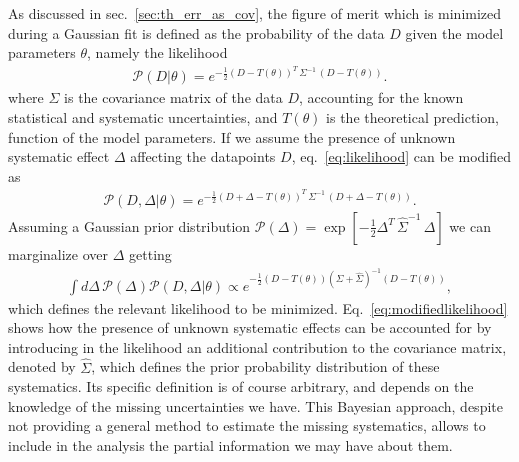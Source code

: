 %
As discussed in sec.~\ref{sec:th_err_as_cov}, the figure of merit which is minimized during a Gaussian fit is defined 
as the probability of the data $D$ given the model parameters $\theta$, namely the likelihood
\begin{align}
    \label{eq:likelihood}
    \mathcal{P}\left(D|\theta\right) = e^{-\frac{1}{2}\left(D-T\left(\theta\right)\right)^T\,
    \Sigma^{-1}\,\left(D-T\left(\theta\right)\right)}.
\end{align}
where $\Sigma$ is the covariance matrix of the data $D$, accounting for the known
statistical and systematic uncertainties, and $T\left(\theta\right)$ is the theoretical prediction,
function of the model parameters.
If we assume the presence of unknown systematic effect $\Delta$ affecting the datapoints $D$, eq.~\eqref{eq:likelihood}
can be modified as
\begin{align}
    \mathcal{P}\left(D,\Delta|\theta\right) = 
    e^{-\frac{1}{2}\left(D+\Delta-T\left(\theta\right)\right)^T\,
    \Sigma^{-1}\,\left(D+\Delta-T\left(\theta\right)\right)}.
\end{align}
Assuming a Gaussian prior distribution 
$\mathcal{P}\left(\Delta\right) = \exp\left[-\frac{1}{2}\Delta^T\,\hat{\Sigma}^{-1}\,\Delta\right]$
we can marginalize over $\Delta$ getting
\begin{align}
    \label{eq:modifiedlikelihood}
    \int d\Delta\,\mathcal{P}\left(\Delta\right) \mathcal{P}\left(D,\Delta|\theta\right)   
    \propto 
    e^{-\frac{1}{2}\left(D-T\left(\theta\right)\right)\left(\Sigma+\hat{\Sigma}\right)^{-1}\left(D-T\left(\theta\right)\right)},
\end{align}
which defines the relevant likelihood to be minimized.
Eq.~\eqref{eq:modifiedlikelihood} shows how the presence of unknown systematic effects can be accounted for by 
introducing in the likelihood an additional contribution to the covariance matrix, denoted by $\hat{\Sigma}$, 
which defines the prior probability distribution of these systematics. Its specific definition is of course arbitrary,
and depends on the knowledge of the missing uncertainties we have.
This Bayesian approach, despite not providing a general method 
to estimate the missing systematics, allows to include in the analysis the partial information we may have about them.


